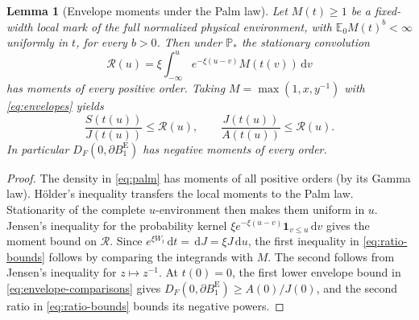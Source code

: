\documentclass[11pt,reqno]{amsart}
\theoremstyle{plain}
\newtheorem{lemma}[theorem]{Lemma}
\theoremstyle{definition}
\theoremstyle{remark}
\newcommand{\E}{\mathbb E}
\newcommand{\Pp}{\mathbb P}
\newcommand{\1}{\mathbf{1}}
\newcommand{\dd}{\,\mathrm d}
\newcommand{\Be}{B^{\mathrm E}}
\begin{document}
\begin{lemma}[Envelope moments under the Palm law]\label{lem:envelope-moment}
Let $M(t)\ge1$ be a fixed-width local mark of the full normalized physical environment, with $\E_0M(t)^b<\infty$ uniformly in $t$, for every $b>0$. Then under $\Pp_*$ the stationary convolution
\begin{equation}\label{eq:Rconvolution}
\mathcal R(u)=\xi\int_{-\infty}^u e^{-\xi(u-v)}M(t(v))\dd v
\end{equation}
has moments of every positive order. Taking $M=\max(1,x,y^{-1})$ with \eqref{eq:envelopes} yields
\begin{equation}\label{eq:ratio-bounds}
\frac{S(t(u))}{J(t(u))}\le\mathcal R(u),\qquad
\frac{J(t(u))}{A(t(u))}\le\mathcal R(u).
\end{equation}
In particular $D_F(0,\partial\Be_1)$ has negative moments of every order.
\end{lemma}
\begin{proof}
The density in \eqref{eq:palm} has moments of all positive orders (by its Gamma law). H\"older's inequality transfers the local moments to the Palm law. Stationarity of the complete $u$-environment then makes them uniform in $u$. Jensen's inequality for the probability kernel $\xi e^{-\xi(u-v)}\1_{v\le u}\dd v$ gives the moment bound on $\mathcal R$. Since $e^{\xi W_t}\dd t=\dd J=\xi J\dd u$, the first inequality in \eqref{eq:ratio-bounds} follows by comparing the integrands with $M$. The second follows from Jensen's inequality for $z\mapsto z^{-1}$. At $t(0)=0$, the first lower envelope bound in \eqref{eq:envelope-comparisons} gives
$D_F(0,\partial\Be_1)\ge A(0)/J(0)$, and the second ratio in \eqref{eq:ratio-bounds} bounds its negative powers.
\end{proof}
\end{document}
